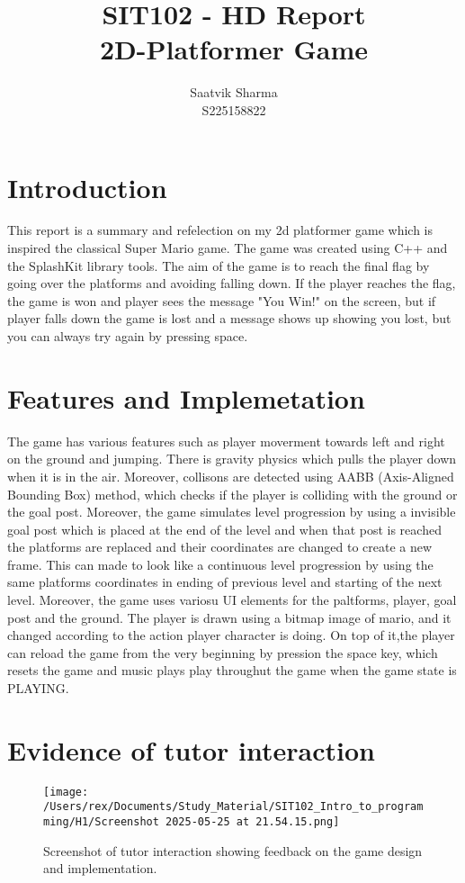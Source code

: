 \documentclass[11pt]{article}
\title{SIT102 - HD Report \\ 2D-Platformer Game}
\author{Saatvik Sharma \\ S225158822}
\date{}
\begin{document}
\maketitle
\newpage
\tableofcontents
\newpage


\section{Introduction}

This report is a summary and refelection on my 2d platformer game which is inspired the classical Super Mario game. The game was created using C++ and the SplashKit library tools. The aim of the game is to reach the final flag by going over the platforms and avoiding falling down. If the player reaches the flag, the game is won and player sees the message "You Win!" on the screen, but if player falls down the game is lost and a message shows up showing you lost, but you can always try again by pressing space.



\section{Features and Implemetation}

The game has various features such as player moverment towards left and right on the ground and jumping. There is gravity physics which pulls the player down when it is in the air. Moreover, collisons are detected using AABB (Axis-Aligned Bounding Box) method, which checks if the player is colliding with the ground or the goal post. Moreover, the game simulates level progression by using a invisible goal post which is placed at the end of the level and when that post is reached the platforms are replaced and their coordinates are changed to create a new frame. This can made to look like a continuous level progression by using the same platforms coordinates in ending of previous level and starting of the next level.
Moreover, the game uses variosu UI elements for the paltforms, player, goal post and the ground. The player is drawn using a bitmap image of mario, and it changed according to the action player character is doing. On top of it,the player can reload the game from the very beginning by pression the space key, which resets the game and music plays play throughut the game when the game state is PLAYING.

\section{Evidence of tutor interaction}
\begin{figure}[!ht]
    \centering
    \texttt{[image: /Users/rex/Documents/Study\_Material/SIT102\_Intro\_to\_programming/H1/Screenshot 2025-05-25 at 21.54.15.png]}
    \caption{Screenshot of tutor interaction showing feedback on the game design and implementation.}
\end{figure}
\end{document}
